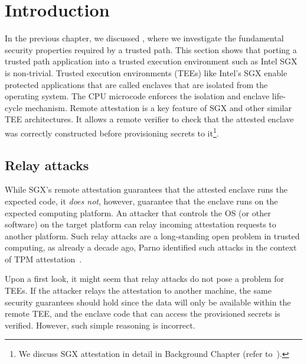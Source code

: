 \section{Introduction}
\label{sec:intro}


In the previous chapter, we discussed \protection, where we investigate the fundamental security properties required by a trusted path. This section shows that porting a trusted path application into a trusted execution environment such as Intel SGX is non-trivial. Trusted execution environments (TEEs) like Intel's SGX enable protected applications that are called enclaves that are isolated from the operating system. The CPU microcode enforces the isolation and enclave life-cycle mechanism. Remote attestation is a key feature of SGX and other similar TEE architectures. It allows a remote verifier to check that the attested enclave was correctly constructed before provisioning secrets to it\footnote{We discuss SGX attestation in detail in Background Chapter (refer to~).}.


\subsection{Relay attacks}  While SGX's remote attestation guarantees that the attested enclave runs the expected code, it \emph{does not}, however,  guarantee that the enclave runs on the expected computing platform. An attacker that controls the OS (or other software) on the target platform can relay incoming attestation requests to another platform. Such relay attacks are a long-standing open problem in trusted computing, as already a decade ago, Parno identified such attacks in the context of TPM attestation~\cite{parno2008bootstrapping}.


Upon a first look, it might seem that relay attacks do not pose a problem for TEEs. If the attacker relays the attestation to another machine, the same security guarantees should hold since the data will only be available within the remote TEE, and the enclave code that can access the provisioned secrets is verified. However, such simple reasoning is incorrect. 

